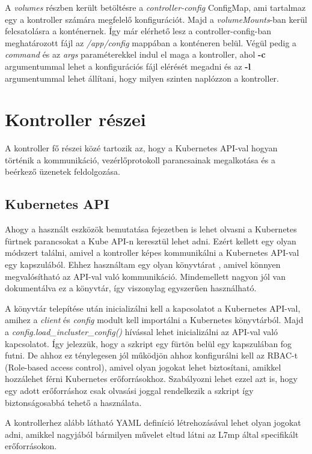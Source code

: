 A \textit{volumes} részben került betöltésre a \textit{controller-config} ConfigMap, ami 
tartalmaz egy a kontroller számára megfelelő konfigurációt. Majd a \textit{volumeMounts}-ban
kerül felcsatolásra a konténernek. Így már elérhető lesz a controller-config-ban meghatározott
fájl az \textit{/app/config} mappában a konténeren belül. Végül pedig a \textit{command} és az
\textit{args} paraméterekkel indul el maga a kontroller, ahol \textbf{-c} argumentummal 
lehet a konfigurációs fájl elérését megadni és az \textbf{-l} argumentummal lehet állítani,
hogy milyen szinten naplózzon a kontroller.

\section{Kontroller részei}

A kontroller fő részei közé tartozik az, hogy a Kubernetes API-val 
hogyan történik a kommunikáció, vezérlőprotokoll parancsainak megalkotása és
a beérkező üzenetek feldolgozása. 

\subsection{Kubernetes API}

Ahogy a használt eszközök bemutatása fejezetben is lehet olvasni a Kubernetes
fürtnek parancsokat a Kube API-n keresztül lehet adni. Ezért kellett egy olyan
módszert találni, amivel a kontroller képes kommunikálni a Kubernetes API-val 
egy kapszulából. Ehhez használtam egy olyan könyvtárat \cite{pythonKubeAPI}, amivel
könnyen megvalósítható az API-val való kommunikáció. Mindemellett nagyon jól
van dokumentálva ez a könyvtár, így viszonylag egyszerűen használható.

A könyvtár telepítése után inicializálni kell a kapcsolatot a Kubernetes 
API-val, amihez a \textit{client} és \textit{config} modult kell importálni
a Kubernetes könyvtárból. Majd a \textit{config.load\_incluster\_config()}
hívással lehet inicializálni az API-val való kapcsolatot. Így jelezzük, hogy a
szkript egy fürtön belül egy kapszulában fog futni. De ahhoz ez ténylegesen jól 
működjön ahhoz konfigurálni kell az RBAC-t (Role-based access control), amivel 
olyan jogokat lehet biztosítani, amikkel hozzálehet férni Kubernetes 
erőforrásokhoz. Szabályozni lehet ezzel azt is, hogy egy adott erőforráshoz 
csak olvasási joggal rendelkezik a szkript így biztonságosabbá tehető a használata.

A kontrollerhez alább látható YAML definíció létrehozásával lehet olyan jogokat
adni, amikkel nagyjából bármilyen művelet eltud látni az L7mp által specifikált 
erőforrásokon.

